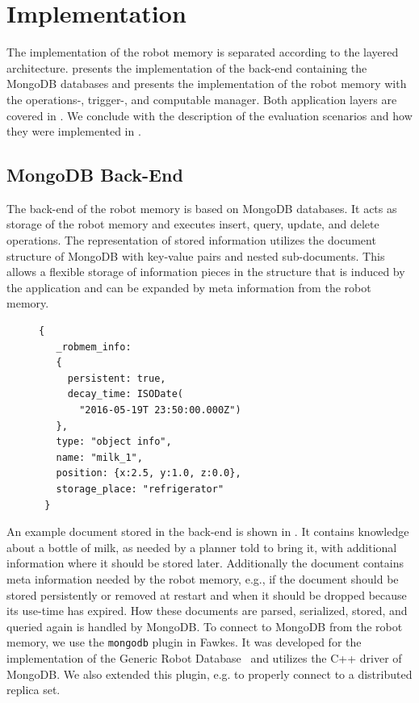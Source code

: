 \chapter{Implementation}
\label{chap:impl}
The implementation of
the robot memory is separated according to the layered
architecture.  presents the implementation of the
back-end containing the MongoDB databases and 
presents the implementation of the robot memory with the operations-,
trigger-, and computable manager. Both application layers are covered
in . We conclude with the description of the
evaluation scenarios and how they were implemented in
.

\section{MongoDB Back-End}
\label{sec:back-end}
The back-end of the robot memory is based on MongoDB databases. It
acts as storage of the robot memory and executes insert, query,
update, and delete operations. The representation of stored information
utilizes the document structure of MongoDB with key-value pairs and
nested sub-documents. This allows a flexible storage of
information pieces in the structure that is induced by the application
and can be expanded by meta information from the robot memory.

\begin{figure}
  \vspace{-0.8cm}
\begin{lstlisting}[style=SmallJSON,
  caption={Representation of a knowledge item in the back-end},
  label=lst:backend,
  framexleftmargin=1pt, xleftmargin=0pt,
 morekeywords={}, numbers=none]
 {
   _robmem_info:
   {
     persistent: true,
     decay_time: ISODate(
       "2016-05-19T 23:50:00.000Z")
   },
   type: "object info",
   name: "milk_1",
   position: {x:2.5, y:1.0, z:0.0},
   storage_place: "refrigerator"
 }
\end{lstlisting}
\vspace{-8mm}
\end{figure}
An example document stored in the back-end is shown in
. It contains knowledge about a bottle of milk, as needed
by a planner told to bring it, with additional information where it
should be stored later. Additionally the document contains meta
information needed by the robot memory, e.g., if the document should be
stored persistently or removed at restart and when it should be
dropped because its use-time has expired. How these documents are
parsed, serialized, stored, and queried again is handled by
MongoDB. To connect to MongoDB from the robot memory, we use the
\texttt{mongodb} plugin in Fawkes. It was developed for the
implementation of the Generic Robot Database~\cite{RoboDB} and
utilizes the C++ driver of MongoDB. We also extended this plugin,
e.g. to properly connect to a distributed replica set.

